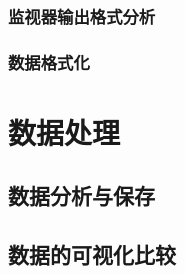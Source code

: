\subsubsection{监视器输出格式分析}
\subsubsection{数据格式化}

\section{数据处理}

\subsection{数据分析与保存}


\subsection{数据的可视化比较}


